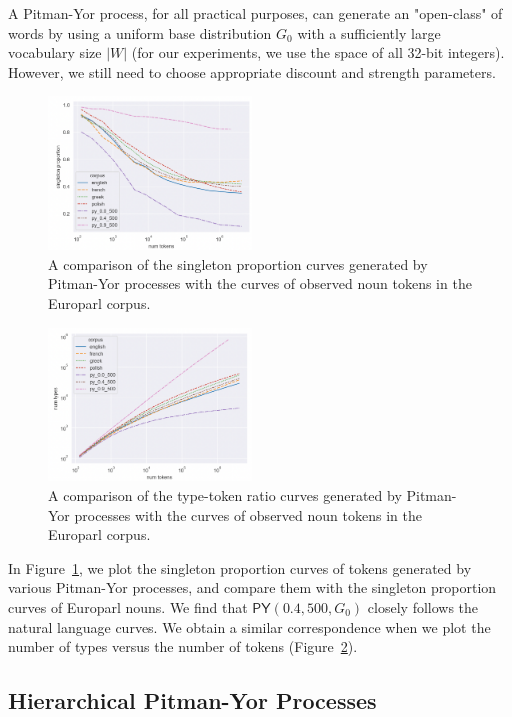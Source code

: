 \documentclass[11pt,a4paper]{article}
\begin{document}
A Pitman-Yor process, for all practical purposes, can generate an "open-class" of words by using a uniform base distribution $G_0$ with a sufficiently large vocabulary size $|W|$ (for our experiments, we use the space of all 32-bit integers). However, we still need to choose appropriate discount and strength parameters.

\begin{figure}[t]
\centering
\includegraphics[width=0.48\textwidth]{images/sp2.png}
\caption{A comparison of the singleton proportion curves generated by Pitman-Yor processes with the curves of observed noun tokens in the Europarl corpus.}
\label{fig:sp2}
\end{figure}

\begin{figure}[t]
\centering
\includegraphics[width=0.48\textwidth]{images/type_token2.png}
\caption{A comparison of the type-token ratio curves generated by Pitman-Yor processes with the curves of observed noun tokens in the Europarl corpus.}
\label{fig:type_token2}
\end{figure}


In Figure~\ref{fig:sp2}, we plot the singleton proportion curves of tokens generated by various Pitman-Yor processes, and compare them with the singleton proportion curves of Europarl nouns. We find that $\mathsf{PY}(0.4, 500, G_0)$ closely follows the natural language curves. We obtain a similar correspondence when we plot the number of types versus the number of tokens (Figure~\ref{fig:type_token2}).


\subsection{Hierarchical Pitman-Yor Processes}
\end{document}
